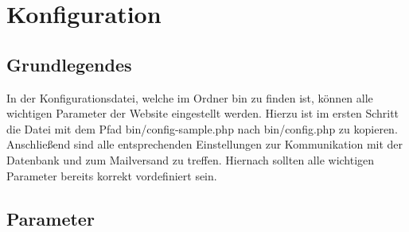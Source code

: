 \chapter{Konfiguration}
\label{chapter:config}
\section{Grundlegendes}
In der Konfigurationsdatei, welche im Ordner {\glqq bin\grqq} zu finden ist, können alle wichtigen Parameter der Website eingestellt werden. Hierzu ist im ersten Schritt die Datei mit dem Pfad {\glqq bin/config-sample.php\grqq} nach {\glqq bin/config.php\grqq} zu kopieren. Anschließend sind alle entsprechenden Einstellungen zur Kommunikation mit der Datenbank und zum Mailversand zu treffen. Hiernach sollten alle wichtigen Parameter bereits korrekt vordefiniert sein.
\section{Parameter}
